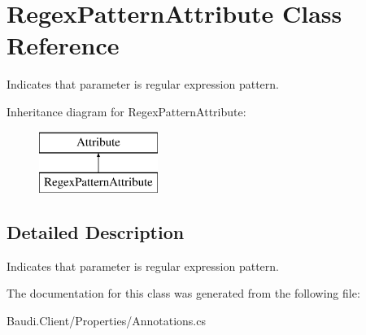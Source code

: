 \hypertarget{class_regex_pattern_attribute}{}\section{Regex\+Pattern\+Attribute Class Reference}
\label{class_regex_pattern_attribute}


Indicates that parameter is regular expression pattern.  


Inheritance diagram for Regex\+Pattern\+Attribute\+:\begin{figure}[H]
\begin{center}
\leavevmode
\includegraphics[height=2.000000cm]{class_regex_pattern_attribute}
\end{center}
\end{figure}


\subsection{Detailed Description}
Indicates that parameter is regular expression pattern. 



The documentation for this class was generated from the following file\+:\begin{DoxyCompactItemize}
\item 
Baudi.\+Client/\+Properties/Annotations.\+cs\end{DoxyCompactItemize}
